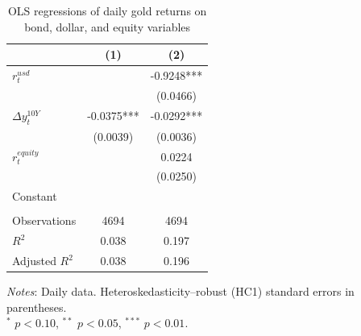 \begin{table}[H]
\centering
\caption{OLS regressions of daily gold returns on bond, dollar, and equity variables}
\label{tab:ols_gold_bond}
\begin{tabular}{lcc}
\toprule
 & (1) & (2) \\
\midrule
$r^{usd}_t$ &  & -0.9248*** \\
 &  & (0.0466) \\
$\Delta y^{10Y}_t$ & -0.0375*** & -0.0292*** \\
 & (0.0039) & (0.0036) \\
$r^{equity}_t$ &  & 0.0224 \\
 &  & (0.0250) \\
Constant &  &  \\
 &  &  \\
Observations & 4694 & 4694 \\
$R^2$ & 0.038 & 0.197 \\
Adjusted $R^2$ & 0.038 & 0.196 \\
\bottomrule
\end{tabular}

\vspace{0.2cm}
\begin{minipage}{0.9\textwidth}
\footnotesize
\textit{Notes}: Daily data. Heteroskedasticity--robust (HC1) standard errors in parentheses.\\
$^*$ $p<0.10$, $^{**}$ $p<0.05$, $^{***}$ $p<0.01$.
\end{minipage}
\end{table}
